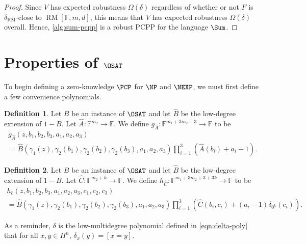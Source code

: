 \documentclass[english,12pt]{reedthesis}
\theoremstyle{plain}
\theoremstyle{definition}
\newtheorem{defn}[defn]{Definition}
\theoremstyle{remark}
\DeclareMathOperator{\RM}{RM}
\begin{document}
\begin{proof}
  Since $V$ has expected robustness $\Omega(\delta)$ regardless of whether or not $F$ is
  $\delta_{\RM}$-close to $\RM[\mathbb{F}, m, d]$, this means that $V$ has expected
  robustness $\Omega(\delta)$ overall. Hence, \cref{alg:sum-pcpp} is a robust PCPP for
  the language $\Sum$.
\end{proof}

\section{Properties of $\OSAT$}

To begin defining a zero-knowledge $\PCP$ for $\NP$ and $\NEXP$, we must first
define a few convenience polynomials.

\begin{defn}\label{def:g_a}
  Let $B$ be an instance of $\OSAT$ and let $\hat{B}$ be the low-degree
  extension of $1 - B$. Let $\hat{A}\colon \mathbb{F}^{m_{2}} \rightarrow \mathbb{F}$. We
  define $g_{\hat{A}}\colon \mathbb{F}^{m_{1} + 3m_{2} + 3} \rightarrow \mathbb{F}$ to be
  \begin{multline}\label{eqn:g_a}
    g_{\hat{A}}(z, b_{1}, b_{2}, b_{3}, a_{1}, a_{2}, a_{3}) \\ =
    \hat{B}(\gamma_{1}(z), \gamma_{2}(b_{1}), \gamma_{2}(b_{2}), \gamma_{2}(b_{3}), a_{1}, a_{2}, a_{3})
    \prod_{i=1}^{3}(\hat{A}(b_{i}) + a_{i} - 1).
  \end{multline}
\end{defn}

\begin{defn}\label{def:h_c}
  Let $B$ be an instance of $\OSAT$ and let $\hat{B}$ be the low-degree
  extension of $1 - B$. Let $\hat{C}\colon \mathbb{F}^{m_{2} + k} \rightarrow \mathbb{F}$.
  We define
  $h_{\hat{C}}\colon \mathbb{F}^{m_{1} + 3m_{2} + 3 + 3k} \rightarrow \mathbb{F}$ to be
  \begin{multline}\label{eqn:h_c}
    h_{\hat{c}}(z, b_{1}, b_{2}, b_{3}, a_{1}, a_{2}, a_{3}, c_{1}, c_{2}, c_{3}) \\ =
    \hat{B}(\gamma_{1}(z), \gamma_{2}(b_{1}), \gamma_{2}(b_{2}), \gamma_{2}(b_{3}), a_{1}, a_{2}, a_{3})
    \prod_{i=1}^{3}(\hat{C}(b_{i}, c_{i}) + (a_{i} - 1)\delta_{0^{k}}(c_{i})).
  \end{multline}
\end{defn}

As a reminder, $\delta$ is the low-multidegree polynomial defined in
\cref{eqn:delta-poly} that for all $x, y \in H^{n}$, $\delta_{x}(y) = [x = y]$.
\end{document}
